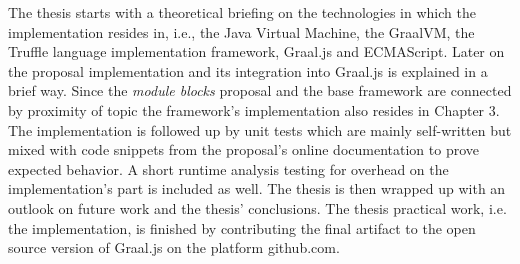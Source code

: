 The thesis starts with a theoretical briefing on the technologies in which the implementation resides in, i.e., the Java Virtual Machine, the GraalVM, the Truffle language implementation framework, Graal.js and ECMAScript. Later on the proposal implementation and its integration into Graal.js is explained in a brief way. Since the \emph{module blocks} proposal and the base framework are connected by proximity of topic the framework's implementation also resides in Chapter 3. The implementation is followed up by unit tests which are mainly self-written but mixed with code snippets from the proposal's online documentation to prove expected behavior. A short runtime analysis testing for overhead on the implementation's part is included as well. The thesis is then wrapped up with an outlook on future work and the thesis' conclusions. The thesis practical work, i.e. the implementation, is finished by contributing the final artifact to the open source version of Graal.js on the platform github.com.
\pagebreak
